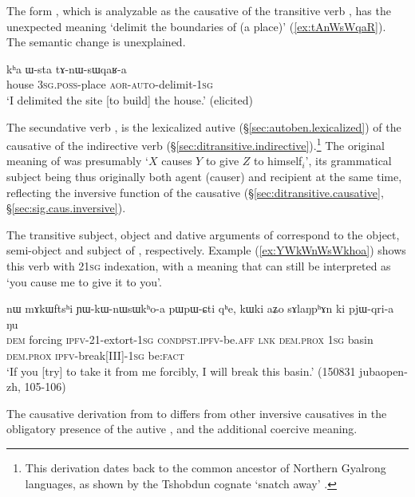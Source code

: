 The form , which is analyzable as the causative of the transitive verb , has the unexpected meaning `delimit the boundaries of (a place)' (\ref{ex:tAnWsWqaR}). The semantic change is unexplained.

\begin{exe} 
\ex \label{ex:tAnWsWqaR}
\gll  kʰa ɯ-sta tɤ-nɯ-sɯqaʁ-a \\
house \textsc{3sg}.\textsc{poss}-place \textsc{aor}-\textsc{auto}-delimit-\textsc{1sg} \\
\glt `I delimited the site [to build] the house.' (elicited)
\end{exe}

The secundative verb , is the lexicalized autive (§\ref{sec:autoben.lexicalized}) of the causative  of the indirective verb  (§\ref{sec:ditransitive.indirective}).\footnote{This derivation dates back to the common ancestor of Northern Gyalrong languages, as shown by the Tshobdun cognate  `snatch away' \citep[220]{jackson19tshobdun}. } The original meaning of  was presumably `$X$ causes $Y$ to give $Z$ to himself$_i$', its grammatical subject being thus originally both agent (causer) and recipient at the same time, reflecting the inversive function of the causative (§\ref{sec:ditransitive.causative}, §\ref{sec:sig.caus.inversive}).

The transitive subject, object and dative arguments of  correspond to the object, semi-object and subject of , respectively. Example (\ref{ex:YWkWnWsWkhoa}) shows this verb with 2\fl{}\textsc{1sg} indexation, with a meaning that can still be interpreted as `you cause me to give it to you'.

\begin{exe}
\ex \label{ex:YWkWnWsWkhoa}
\gll  nɯ mɤkɯftsʰi ɲɯ-kɯ-nɯsɯkʰo-a pɯ\redp{}pɯ-ɕti qʰe, kɯki aʑo sɤlaŋpʰɤn ki pjɯ-qri-a ŋu \\
\textsc{dem} forcing \textsc{ipfv}-2\fl{}1-extort-\textsc{1sg} \textsc{cond}\redp{}\textsc{pst}.\textsc{ipfv}-be.\textsc{aff} \textsc{lnk} \textsc{dem}.\textsc{prox} \textsc{1sg} basin \textsc{dem}.\textsc{prox} \textsc{ipfv}-break[III]-\textsc{1sg} be:\textsc{fact} \\
\glt `If you [try] to take it from me forcibly, I will break this basin.' (150831 jubaopen-zh, 105-106)
\end{exe}

The causative derivation from  to  differs from other inversive causatives in the obligatory presence of the autive , and the additional coercive meaning.

